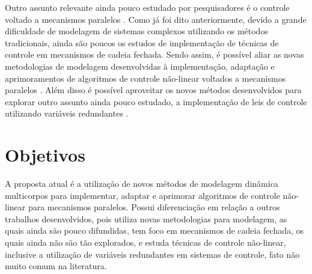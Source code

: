 \documentclass[a4paper,11pt,brazil,fleqn]{article}
\begin{document}
	Outro assunto relevante ainda pouco estudado por pesquisadores \'e o controle voltado a mecanismos paralelos \cite{Merlet2002}. Como j\'a foi dito anteriormente, devido a grande dificuldade de modelagem de sistemas complexos utilizando os m\'etodos tradicionais, ainda s\~ao poucos os estudos de implementa\c{c}\~ao de t\'ecnicas de controle em mecanismos de cadeia fechada. Sendo assim, \'e poss\'ivel aliar as novas metodologias de modelagem desenvolvidas à implementa\c{c}\~ao, adapta\c{c}\~ao e aprimoramentos de algoritmos de controle n\~ao-linear voltados a mecanismos paralelos \cite{Craig}. Al\'em disso \'e poss\'ivel aproveitar os novos m\'etodos desenvolvidos para explorar outro assunto ainda pouco estudado, a implementa\c{c}\~ao de leis de controle utilizando vari\'aveis redundantes \cite{ Rynaldo,Jarzebowska2009, Zubizarreta, Bloch}.


\section{Objetivos}\label{S02}

A proposta atual \'e a utiliza\c{c}\~ao de novos m\'etodos de modelagem din\^amica multicorpos para implementar, adaptar e aprimorar algoritmos de controle n\~ao-linear para mecanismos paralelos. Possui diferencia\c{c}\~ao em rela\c{c}\~ao a outros trabalhos desenvolvidos, pois utiliza novas metodologias para modelagem, as quais ainda s\~ao pouco difundidas, tem foco em mecanismos de cadeia fechada, os quais ainda n\~ao s\~ao t\~ao explorados, e estuda t\'ecnicas de controle n\~ao-linear, inclusive a utiliza\c{c}\~ao de vari\'aveis redundantes em sistemas de controle, fato n\~ao muito comum na literatura.
\end{document}
